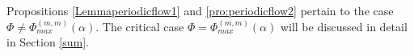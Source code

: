 \documentclass[reqno,12pt]{amsart}
\newtheorem{remark}{Remark}[section]
\begin{document}
Propositions \ref{Lemmaperiodicflow1} and \ref{pro:periodicflow2} pertain to the case $\Phi\neq \Phi^{(m, m)}_{max}(\alpha)$. The critical case $\Phi=\Phi^{(m, m)}_{max}(\alpha)$ will be discussed in detail in Section \ref{sum}.


\end{document}
